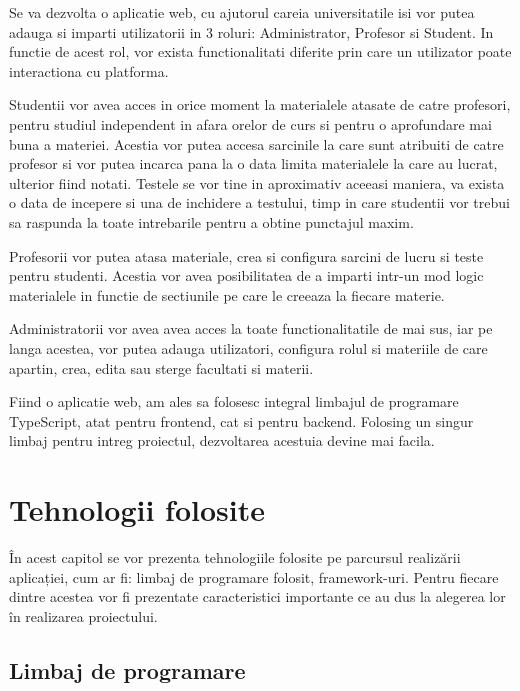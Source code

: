 \documentclass[12pt, a4paper, oneside, romanian]{teza-upb}
\begin{document}
Se va dezvolta o aplicatie web, cu ajutorul careia universitatile isi vor putea adauga si imparti utilizatorii in 3 roluri: Administrator, Profesor si Student. In functie de acest rol, vor exista functionalitati diferite prin care un utilizator poate interactiona cu platforma.

Studentii vor avea acces in orice moment la materialele atasate de catre profesori, pentru studiul independent in afara orelor de curs si pentru o aprofundare mai buna a materiei. Acestia vor putea accesa sarcinile la care sunt atribuiti de catre profesor si vor putea incarca pana la o data limita materialele la care au lucrat, ulterior fiind notati. Testele se vor tine in aproximativ aceeasi maniera, va exista o data de incepere si una de inchidere a testului, timp in care studentii vor trebui sa raspunda la toate intrebarile pentru a obtine punctajul maxim.

Profesorii vor putea atasa materiale, crea si configura sarcini de lucru si teste pentru studenti. Acestia vor avea posibilitatea de a imparti intr-un mod logic materialele in functie de sectiunile pe care le creeaza la fiecare materie.

Administratorii vor avea avea acces la toate functionalitatile de mai sus, iar pe langa acestea, vor putea adauga utilizatori, configura rolul si materiile de care apartin, crea, edita sau sterge facultati si materii.

Fiind o aplicatie web, am ales sa folosesc integral limbajul de programare TypeScript, atat pentru frontend, cat si pentru backend. Folosing un singur limbaj pentru intreg proiectul, dezvoltarea acestuia devine mai facila.

\chapter{Tehnologii folosite}

În acest capitol se vor prezenta tehnologiile folosite pe parcursul realizării aplicației, cum ar fi: limbaj de programare folosit, framework-uri. Pentru fiecare dintre acestea vor fi prezentate caracteristici importante ce au dus la alegerea lor în realizarea proiectului.

\section{Limbaj de programare}
\end{document}
